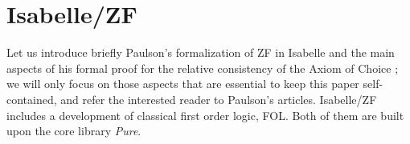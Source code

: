 \section{Isabelle/ZF}

Let us introduce briefly Paulson's formalization of ZF
\cite{paulson2017isabelle} in Isabelle and the main aspects of his
formal proof for the relative consistency of the Axiom of Choice
\cite{paulson_2003}; we will only focus on those aspects that are
essential to keep this paper self-contained, and refer the interested
reader to Paulson's articles.
Isabelle/ZF includes a development of classical first order logic,
FOL. Both of them are  built upon the core library \emph{Pure}. 

